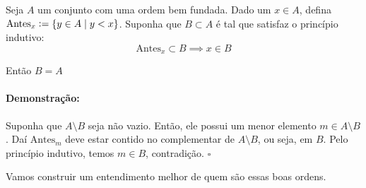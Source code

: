 \documentclass[11pt]{article}
\newcommand{\defeq}{\vcentcolon=}
\newcommand{\pulinho}{\vspace{.5cm}}
\theoremstyle{definition}
\theoremstyle{definition}
\newtheorem*{theorem*}{Teorema}
\newenvironment{teorema*}{
\definecolor{shadecolor}{HTML}{f59aa3}
\begin{shaded}
\begin{theorem*}
}
{
\end{theorem*}
\end{shaded}
}
\theoremstyle{definition}
\theoremstyle{definition}
\theoremstyle{definition}
\theoremstyle{definition}
\theoremstyle{definition}
\theoremstyle{definition}
\theoremstyle{definition}
\theoremstyle{definition}
\theoremstyle{definition}
\theoremstyle{definition}
\newenvironment{prova}{\paragraph{Demonstração:}}{\hfill$\square$ 
\pulinho
}
\theoremstyle{definition}
\begin{document}
\begin{teorema*}
Seja $A$ um conjunto com uma ordem bem fundada. Dado um $x \in A$, defina $\text{Antes}_x \defeq \{y \in A \mid y < x \}$. Suponha que $B \subset A$ é tal que satisfaz o princípio indutivo:
\[
\text{Antes}_x \subset B \implies x \in B
\]

Então $B = A$
\end{teorema*}
\begin{prova}
Suponha que $A \setminus B$ seja não vazio. Então, ele possui um menor elemento $m \in A \setminus B$. Daí $\text{Antes}_m$ deve estar contido no complementar de $A \setminus B$, ou seja, em $B$. Pelo princípio indutivo, temos $m \in B$, contradição.
\end{prova}

Vamos construir um entendimento melhor de quem são essas boas ordens.
\end{document}
